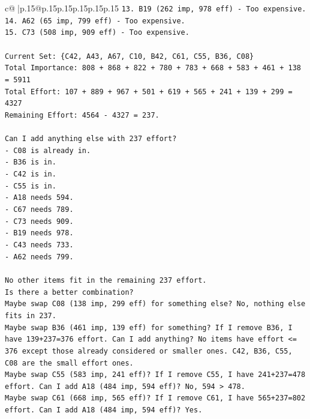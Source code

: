 \documentclass{article}
\begin{document}
{\begin{supertabular}{c@{$\;$}|p{.15\linewidth}@{}p{.15\linewidth}p{.15\linewidth}p{.15\linewidth}p{.15\linewidth}p{.15\linewidth}}
{{{\texttt{13. B19 (262 imp, 978 eff) {-} Too expensive.} \\
\texttt{14. A62 (65 imp, 799 eff) {-} Too expensive.} \\
\texttt{15. C73 (508 imp, 909 eff) {-} Too expensive.} \\
\\ 
\texttt{Current Set: \{C42, A43, A67, C10, B42, C61, C55, B36, C08\}} \\
\texttt{Total Importance: 808 + 868 + 822 + 780 + 783 + 668 + 583 + 461 + 138 = 5911} \\
\texttt{Total Effort: 107 + 889 + 967 + 501 + 619 + 565 + 241 + 139 + 299 = 4327} \\
\texttt{Remaining Effort: 4564 {-} 4327 = 237.} \\
\\ 
\texttt{Can I add anything else with 237 effort?} \\
\texttt{{-} C08 is already in.} \\
\texttt{{-} B36 is in.} \\
\texttt{{-} C42 is in.} \\
\texttt{{-} C55 is in.} \\
\texttt{{-} A18 needs 594.} \\
\texttt{{-} C67 needs 789.} \\
\texttt{{-} C73 needs 909.} \\
\texttt{{-} B19 needs 978.} \\
\texttt{{-} C43 needs 733.} \\
\texttt{{-} A62 needs 799.} \\
\\ 
\texttt{No other items fit in the remaining 237 effort.} \\
\texttt{Is there a better combination?} \\
\texttt{Maybe swap C08 (138 imp, 299 eff) for something else? No, nothing else fits in 237.} \\
\texttt{Maybe swap B36 (461 imp, 139 eff) for something? If I remove B36, I have 139+237=376 effort. Can I add anything? No items have effort <= 376 except those already considered or smaller ones. C42, B36, C55, C08 are the small effort ones.} \\
\texttt{Maybe swap C55 (583 imp, 241 eff)? If I remove C55, I have 241+237=478 effort. Can I add A18 (484 imp, 594 eff)? No, 594 > 478.} \\
\texttt{Maybe swap C61 (668 imp, 565 eff)? If I remove C61, I have 565+237=802 effort. Can I add A18 (484 imp, 594 eff)? Yes.} \\
}}}
\end{supertabular}}
\end{document}
